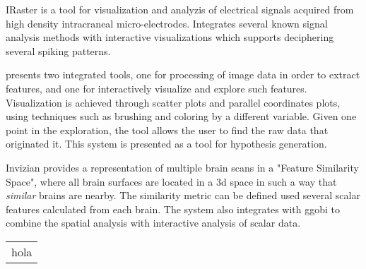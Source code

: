 IRaster \autocite{somerville_iraster:_2010}  is a tool for visualization and analyzis of electrical signals acquired from high density intracraneal micro-electrodes. Integrates several known signal analysis methods with interactive visualizations which supports deciphering several spiking patterns.

\autocite{steenwijk_integrated_2010} presents two integrated tools, one for processing of image data in order to extract features, and one for interactively visualize and explore such features. Visualization is achieved through scatter plots and parallel coordinates plots, using techniques such as brushing and coloring by a different variable.  Given one point in the exploration, the tool allows the user to find the raw data that originated it. This system is presented as a tool for hypothesis generation. 

Invizian \autocite{bowman_query-based_2011, bowman_visual_2012, van_horn_graphical_2013} provides a representation of multiple brain scans in a "Feature Similarity Space", where all brain surfaces are located in a 3d space in such a way that \emph{similar} brains are nearby. The similarity metric can be defined used several scalar features calculated from each brain. The system also integrates with ggobi to combine the spatial analysis with interactive analysis of scalar data.

\begin{table}
	\centering
		\begin{tabular}{c}
			hola
		\end{tabular}
	\label{tab_related_applications}
\end{table}